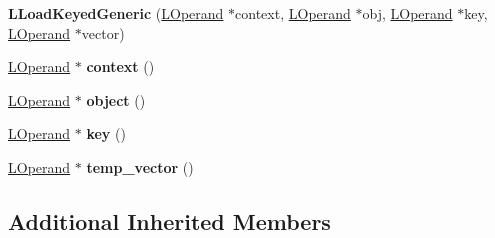 \begin{DoxyCompactItemize}
\item 
{\bfseries L\+Load\+Keyed\+Generic} (\hyperlink{classv8_1_1internal_1_1_l_operand}{L\+Operand} $\ast$context, \hyperlink{classv8_1_1internal_1_1_l_operand}{L\+Operand} $\ast$obj, \hyperlink{classv8_1_1internal_1_1_l_operand}{L\+Operand} $\ast$key, \hyperlink{classv8_1_1internal_1_1_l_operand}{L\+Operand} $\ast$vector)\hypertarget{classv8_1_1internal_1_1_l_load_keyed_generic_ae032327599cdca64b80d9e368ac5a16e}{}\label{classv8_1_1internal_1_1_l_load_keyed_generic_ae032327599cdca64b80d9e368ac5a16e}

\item 
\hyperlink{classv8_1_1internal_1_1_l_operand}{L\+Operand} $\ast$ {\bfseries context} ()\hypertarget{classv8_1_1internal_1_1_l_load_keyed_generic_a522e2bd4a7d1b71a95f891c1fc9a99c8}{}\label{classv8_1_1internal_1_1_l_load_keyed_generic_a522e2bd4a7d1b71a95f891c1fc9a99c8}

\item 
\hyperlink{classv8_1_1internal_1_1_l_operand}{L\+Operand} $\ast$ {\bfseries object} ()\hypertarget{classv8_1_1internal_1_1_l_load_keyed_generic_aadfba9d6286d59cc727bce5ae1b74ee7}{}\label{classv8_1_1internal_1_1_l_load_keyed_generic_aadfba9d6286d59cc727bce5ae1b74ee7}

\item 
\hyperlink{classv8_1_1internal_1_1_l_operand}{L\+Operand} $\ast$ {\bfseries key} ()\hypertarget{classv8_1_1internal_1_1_l_load_keyed_generic_ad55d2217ba38aa46911c0e797a610388}{}\label{classv8_1_1internal_1_1_l_load_keyed_generic_ad55d2217ba38aa46911c0e797a610388}

\item 
\hyperlink{classv8_1_1internal_1_1_l_operand}{L\+Operand} $\ast$ {\bfseries temp\+\_\+vector} ()\hypertarget{classv8_1_1internal_1_1_l_load_keyed_generic_ac529ed41ee727bf1e320ad6711ce2cff}{}\label{classv8_1_1internal_1_1_l_load_keyed_generic_ac529ed41ee727bf1e320ad6711ce2cff}

\end{DoxyCompactItemize}
\subsection*{Additional Inherited Members}


